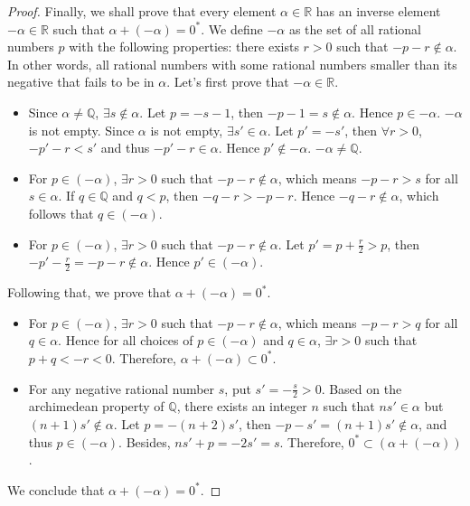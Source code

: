\documentclass[onecolumn]{article}
\begin{document}
\begin{proof}
  Finally, we shall prove that every element $\alpha \in \mathbb{R}$ has an 
  inverse element $-\alpha \in \mathbb{R}$ such that $\alpha + (-\alpha) = 0^*$. 
  We define $-\alpha$ as the set of all rational numbers $p$ with the following 
  properties: there exists $r > 0$ such that $-p - r \notin \alpha$. In other 
  words, all rational numbers with some rational numbers smaller than its 
  negative that fails to be in $\alpha$. Let's first prove that 
  $-\alpha \in \mathbb{R}$.
  \begin{itemize}
    \item Since $\alpha \neq \mathbb{Q}$, $\exists s \notin \alpha$. Let 
    $p = -s - 1$, then $-p - 1 = s \notin \alpha$. Hence $p \in -\alpha$. 
    $-\alpha$ is not empty. Since $\alpha$ is not empty, $\exists s' \in \alpha$. 
    Let $p' = -s'$, then $\forall r > 0$, $-p' - r < s'$ and thus 
    $-p' - r \in \alpha$. Hence $p' \notin -\alpha$. $-\alpha \neq \mathbb{Q}$.
    \item For $p \in (-\alpha)$, $\exists r > 0$ such that $-p - r \notin \alpha$, 
    which means $-p - r > s$ for all $s \in \alpha$. If $q \in \mathbb{Q}$ and 
    $q < p$, then $-q - r > -p - r$. Hence $-q - r \notin \alpha$, which follows 
    that $q \in (-\alpha)$.
    \item  For $p \in (-\alpha)$, $\exists r > 0$ such that 
    $-p - r \notin \alpha$. Let $p' = p + \frac{r}{2} > p$, then 
    $-p' - \frac{r}{2} = -p - r \notin \alpha$. Hence $p' \in (-\alpha)$.
  \end{itemize}
  Following that, we prove that $\alpha + (-\alpha) = 0^*$.
  \begin{itemize}
    \item For $p \in (-\alpha)$, $\exists r > 0$ such that $-p - r \notin \alpha$, 
    which means $-p - r > q$ for all $q \in \alpha$. Hence for all choices of 
    $p \in (-\alpha)$ and $q \in \alpha$, $\exists r > 0$ such that 
    $p + q < -r < 0$. Therefore, $\alpha + (-\alpha) \subset 0^*$.
    \item For any negative rational number $s$, put $s' = -\frac{s}{2} > 0$. 
    Based on the archimedean property of $\mathbb{Q}$, there exists an integer 
    $n$ such that $ns' \in \alpha$ but $(n+1)s' \notin \alpha$. Let 
    $p = -(n+2)s'$, then $-p - s' = (n+1)s' \notin \alpha$, and thus 
    $p \in (-\alpha)$. Besides, $ns' + p = -2s' = s$. Therefore, 
    $0^* \subset (\alpha + (-\alpha))$.
  \end{itemize}
  We conclude that $\alpha + (-\alpha) = 0^*$.
\end{proof}
\end{document}
